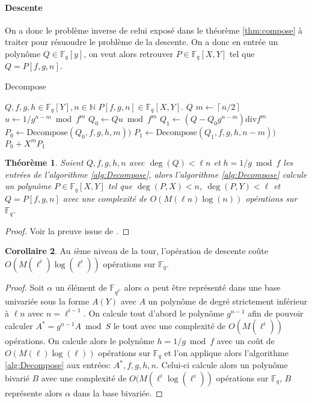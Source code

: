 \documentclass[10pt,a4paper]{book}
\theoremstyle{plain}
\newtheorem{thm}{Théorème}
\theoremstyle{definition}
\theoremstyle{definition}
\newtheorem{cor}[thm]{Corollaire}
\theoremstyle{definition}
\theoremstyle{definition}
\theoremstyle{remark}
\theoremstyle{remark}
\begin{document}
\paragraph{Descente}
On a donc le problème inverse de celui exposé dans le théorème \ref{thm:compose} à traiter pour résuoudre le problème de la descente. On a donc en entrée un polynôme $Q \in \mathbb{F}_q[y]$, on veut alors retrouver $P\in \mathbb{F}_q[X,Y]$ tel que $Q=P[f,g,n]$. 
\begin{algorithm}
\caption{\label{alg:Decompose}Decompose}
\begin{algorithmic}[1]
\REQUIRE $Q,f,g,h \in \mathbb{F}_q[Y], n \in \mathbb{N}$
\ENSURE $P[f,g,n] \in \mathbb{F}_q[X,Y]$.
 \RETURN $Q$
\ELSE
\STATE $m \gets \left\lceil n/2 \right\rceil   $
\STATE $u \gets 1/g^{n-m} \bmod f^m$
\STATE $Q_0 \gets Qu \bmod f^m$
\STATE $Q_1 \gets (Q-Q_0g^{n-m}) \mathrm{div} f^m$
\STATE $P_0 \gets \textrm{Decompose}(Q_0,f,g,h,m))$
\STATE $P_1 \gets \textrm{Decompose}(Q_1,f,g,h,n-m))$
\RETURN $P_0 + X^mP_1$ 
\ENDIF
\end{algorithmic}
\end{algorithm}

\begin{thm}
Soient $Q,f,g,h,n$ avec $\deg(Q)<\ell n$ et $h=1/g \bmod f$ les entrées de l'algorithme \ref{alg:Decompose}, alors l'algorithme \ref{alg:Decompose} calcule un polynôme $P \in \mathbb{F}_q[X,Y]$ tel que $\deg(P,X)<n$, $\deg(P,Y)<\ell$ et $Q=P[f,g,n]$ avec une complexité de $O(M(\ell n) \log(n))$ opérations sur $\mathbb{F}_q$.
\end{thm}

\begin{proof}
Voir la preuve issue de \cite{DeFeo-Doliskani-Schost13}.
\end{proof}

\begin{cor}
Au $i$ème niveau de la tour, l'opération de descente coûte $O(M(\ell^i)\log(\ell^i))$ opérations sur $\mathbb{F}_q$.
\end{cor}

\begin{proof}
Soit $\alpha$ un élément de $\mathbb{F}_{q^{\ell^i}}$ alors $\alpha$ peut être représenté dans une base univariée sous la forme $A(Y)$ avec $A$ un polynôme de degré strictement inférieur à $\ell n $ avec $n=\ell^{i-1}$. On calcule tout d'abord le polynôme $g^{n-1}$ afin de pouvoir calculer $A^*=g^{n-1}A \bmod S$ le tout avec une complexité de $O(M(\ell^i))$ opérations. On calcule alors le polynôme $h=1/g \bmod f$ avec un coût de $O(M(\ell)\log(\ell))$ opérations sur $\mathbb{F}_q$ et l'on applique alors l'algorithme \ref{alg:Decompose} aux entrées: $A^*,f,g,h,n$. Celui-ci calcule alors un polynôme bivarié $B$ avec une complexité de $O(M(\ell^i\log(\ell^i))$ opérations sur $\mathbb{F}_q$, $B$ représente alors $\alpha$ dans la base bivariée.
\end{proof}
\end{document}
